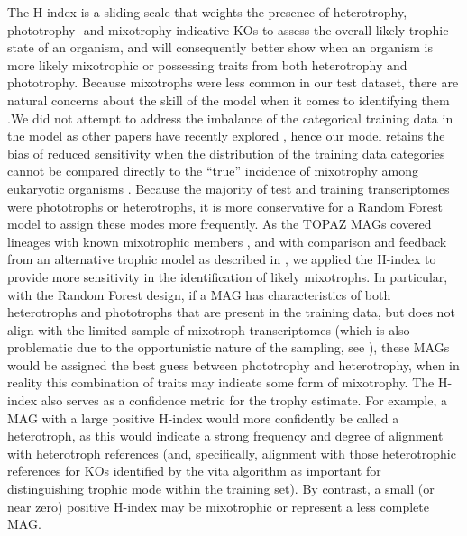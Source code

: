 \documentclass[12pt]{article}
\numberwithin{equation}{section}
\begin{document}
The H-index is a sliding scale that weights the presence of heterotrophy, phototrophy- and mixotrophy-indicative KOs to assess the overall likely trophic state of an organism, and will consequently better show when an organism is more likely mixotrophic or possessing traits from both heterotrophy and phototrophy. Because mixotrophs were less common in our test dataset, there are natural concerns about the skill of the model when it comes to identifying them \citep{vabalas2019machine}.We did not attempt to address the imbalance of the categorical training data in the model as other papers have recently explored \citep{utkin2020imprecise,collins2020training}, hence our model retains the bias of reduced sensitivity when the distribution of the training data categories cannot be compared directly to the ``true'' incidence of mixotrophy among eukaryotic organisms \citep{khalilia2011predicting}. Because the majority of test and training transcriptomes were phototrophs or heterotrophs, it is more conservative for a Random Forest model to assign these modes more frequently. As the TOPAZ MAGs covered lineages with known mixotrophic members \citep{jones2000mixotrophy}, and with comparison and feedback from an alternative trophic model as described in , we applied the H-index to provide more sensitivity in the identification of likely mixotrophs. In particular, with the Random Forest design, if a MAG has characteristics of both heterotrophs and phototrophs that are present in the training data, but does not align with the limited sample of mixotroph transcriptomes (which is also problematic due to the opportunistic nature of the sampling, see  ), these MAGs would be assigned the best guess between phototrophy and heterotrophy, when in reality this combination of traits may indicate some form of mixotrophy. The H-index also serves as a confidence metric for the trophy estimate. For example, a MAG with a large positive  H-index would more confidently be called a heterotroph, as this would indicate a strong frequency and degree of alignment with heterotroph references (and, specifically, alignment with those heterotrophic references for KOs identified by the vita algorithm as important for distinguishing trophic mode within the training set). By contrast, a small (or near zero) positive H-index may be mixotrophic or represent a less complete MAG. 
\end{document}
